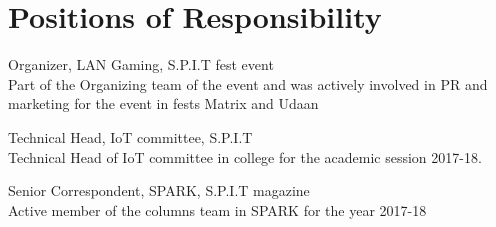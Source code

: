 \documentclass{tccv}
\begin{document}
\section{Positions of Responsibility}
\begin{eventlist}
\item{}{}{Organizer, LAN Gaming, S.P.I.T fest event}
\\Part of the Organizing team of the event and was actively involved
in PR and marketing for the event in fests Matrix and Udaan

\item{}{}{Technical Head, IoT committee, S.P.I.T}
\\Technical Head  of IoT committee in college for the academic session 2017-18.

\item{}{}{Senior Correspondent, SPARK, S.P.I.T magazine}
\\Active member of the columns team in SPARK for the year 2017-18
\end{eventlist}
\end{document}
